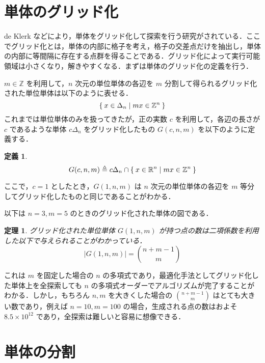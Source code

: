 \documentclass[a4paper,11pt]{jreport}
\newtheorem{definition}{定義}
\newtheorem{theorem}{定理}
\begin{document}
\section{単体のグリッド化}

de Klerk \cite{deklerk} などにより，単体をグリッド化して探索を行う研究がされている．ここでグリッド化とは，単体の内部に格子を考え，格子の交差点だけを抽出し，単体の内部に等間隔に存在する点群を得ることである．グリッド化によって実行可能領域は小さくなり，解きやすくなる．まずは単体のグリッド化の定義を行う．\par
$ m \in \mathbb{Z} $ を利用して，$ n $ 次元の単位単体の各辺を $ m $ 分割して得られるグリッド化された単位単体は以下のように表せる．
$$ \Set{ x \in \Delta_n | mx \in \mathbb{Z}^n } $$
これまでは単位単体のみを扱ってきたが，正の実数 $ c $ を利用して，各辺の長さが $ c $ であるような単体 $ c \Delta_n $ をグリッド化したもの $ G(c, n, m) $ を以下のように定義する．\par
\begin{definition}
$$ G(c, n, m) \triangleq c \Delta_n \cap \Set{x \in \mathbb{R}^n | mx \in \mathbb{Z}^n} $$
\end{definition}
ここで，$ c = 1 $ としたとき，$ G(1, n, m) $ は $ n $ 次元の単位単体の各辺を $ m $ 等分してグリッド化したものと同じであることがわかる．\par
以下は $ n = 3, m = 5 $ のときのグリッド化された単体の図である．\\

\begin{theorem} \label{n_grid}
グリッド化された単位単体 $ G(1, n, m) $ が持つ点の数は二項係数を利用した以下で与えられることがわかっている．
$$ | G(1, n, m) | = \binom{n + m - 1}{m} $$
\end{theorem}

これは $ m $ を固定した場合の $ n $ の多項式であり，最適化手法としてグリッド化した単体上を全探索しても $ n $ の多項式オーダーでアルゴリズムが完了することがわかる．しかし，もちろん $ n, m $ を大きくした場合の $ \binom{n + m - 1}{m} $ はとても大きい数であり，例えば $ n = 10, m = 100 $ の場合，生成される点の数はおよそ $ 8.5 \times 10^{12} $ であり，全探索は難しいと容易に想像できる．\par

\section{単体の分割} \label{partition}
\end{document}
